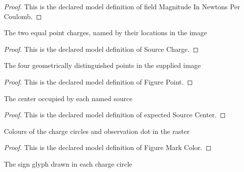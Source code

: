\begin{proof}
  This is the declared model definition of field Magnitude In Newtons Per Coulomb.
\end{proof}
\begin{definition}
  \label{def:physics:phyx-mini-0913:phyxminiproblems-problemphyxmini0913-sourcecharge}
  The two equal point charges, named by their locations in the image
\end{definition}
\begin{proof}
  This is the declared model definition of Source Charge.
\end{proof}
\begin{definition}
  \label{def:physics:phyx-mini-0913:phyxminiproblems-problemphyxmini0913-figurepoint}
  The four geometrically distinguished points in the supplied image
\end{definition}
\begin{proof}
  This is the declared model definition of Figure Point.
\end{proof}
\begin{definition}
  \label{def:physics:phyx-mini-0913:phyxminiproblems-problemphyxmini0913-expectedsourcecenter}
  The center occupied by each named source
\end{definition}
\begin{proof}
  This is the declared model definition of expected Source Center.
\end{proof}
\begin{definition}
  \label{def:physics:phyx-mini-0913:phyxminiproblems-problemphyxmini0913-figuremarkcolor}
  Colours of the charge circles and observation dot in the raster
\end{definition}
\begin{proof}
  This is the declared model definition of Figure Mark Color.
\end{proof}
\begin{definition}
  \label{def:physics:phyx-mini-0913:phyxminiproblems-problemphyxmini0913-figurechargesign}
  The sign glyph drawn in each charge circle
\end{definition}
